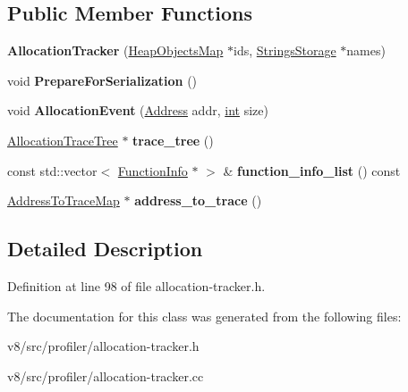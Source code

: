 \subsection*{Public Member Functions}
\begin{DoxyCompactItemize}
\item 
\mbox{\label{classv8_1_1internal_1_1AllocationTracker_ae705bae00ff323c41efc0b1d50afc62c}} 
{\bfseries Allocation\+Tracker} (\mbox{\hyperlink{classv8_1_1internal_1_1HeapObjectsMap}{Heap\+Objects\+Map}} $\ast$ids, \mbox{\hyperlink{classv8_1_1internal_1_1StringsStorage}{Strings\+Storage}} $\ast$names)
\item 
\mbox{\label{classv8_1_1internal_1_1AllocationTracker_a06984664822efec67f15cfc200f9c1c8}} 
void {\bfseries Prepare\+For\+Serialization} ()
\item 
\mbox{\label{classv8_1_1internal_1_1AllocationTracker_af59e0f4c414b6fe00ff0729e616ae219}} 
void {\bfseries Allocation\+Event} (\mbox{\hyperlink{classuintptr__t}{Address}} addr, \mbox{\hyperlink{classint}{int}} size)
\item 
\mbox{\label{classv8_1_1internal_1_1AllocationTracker_aa0471186f074acec90232839b6e22431}} 
\mbox{\hyperlink{classv8_1_1internal_1_1AllocationTraceTree}{Allocation\+Trace\+Tree}} $\ast$ {\bfseries trace\+\_\+tree} ()
\item 
\mbox{\label{classv8_1_1internal_1_1AllocationTracker_aa5efd08c197a25727449c819519a0853}} 
const std\+::vector$<$ \mbox{\hyperlink{structv8_1_1internal_1_1AllocationTracker_1_1FunctionInfo}{Function\+Info}} $\ast$ $>$ \& {\bfseries function\+\_\+info\+\_\+list} () const
\item 
\mbox{\label{classv8_1_1internal_1_1AllocationTracker_adacf25ec6310501fb4d9ae02c1737621}} 
\mbox{\hyperlink{classv8_1_1internal_1_1AddressToTraceMap}{Address\+To\+Trace\+Map}} $\ast$ {\bfseries address\+\_\+to\+\_\+trace} ()
\end{DoxyCompactItemize}


\subsection{Detailed Description}


Definition at line 98 of file allocation-\/tracker.\+h.



The documentation for this class was generated from the following files\+:\begin{DoxyCompactItemize}
\item 
v8/src/profiler/allocation-\/tracker.\+h\item 
v8/src/profiler/allocation-\/tracker.\+cc\end{DoxyCompactItemize}

